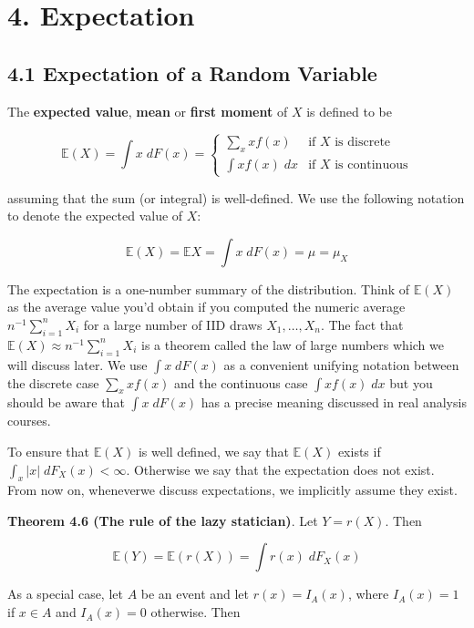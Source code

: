 \section{4. Expectation}\label{expectation}

\subsection{4.1 Expectation of a Random
Variable}\label{expectation-of-a-random-variable}

The \textbf{expected value}, \textbf{mean} or \textbf{first moment} of
\(X\) is defined to be

\[ \mathbb{E}(X) = \int x \; dF(x) = \begin{cases}
\sum_x x f(x) &\text{if } X \text{ is discrete} \\
\int x f(x)\; dx &\text{if } X \text{ is continuous}
\end{cases} \]

assuming that the sum (or integral) is well-defined. We use the
following notation to denote the expected value of \(X\):

\[ \mathbb{E}(X) = \mathbb{E}X = \int x\; dF(x) = \mu = \mu_X \]

The expectation is a one-number summary of the distribution. Think of
\(\mathbb{E}(X)\) as the average value you'd obtain if you computed the
numeric average \(n^{-1} \sum_{i=1}^n X_i\) for a large number of IID
draws \(X_1, \dots, X_n\). The fact that
\(\mathbb{E}(X) \approx n^{-1} \sum_{i=1}^n X_i\) is a theorem called
the law of large numbers which we will discuss later. We use
\(\int x \; dF(x)\) as a convenient unifying notation between the
discrete case \(\sum_x x f(x)\) and the continuous case
\(\int x f(x) \; dx\) but you should be aware that \(\int x \; dF(x)\)
has a precise meaning discussed in real analysis courses.

To ensure that \(\mathbb{E}(X)\) is well defined, we say that
\(\mathbb{E}(X)\) exists if \(\int_x |x| \; dF_X(x) < \infty\).
Otherwise we say that the expectation does not exist. From now on,
wheneverwe discuss expectations, we implicitly assume they exist.

\textbf{Theorem 4.6 (The rule of the lazy statician)}. Let \(Y = r(X)\).
Then

\[ \mathbb{E}(Y) = \mathbb{E}(r(X)) = \int r(x) \; dF_X(x) \]

As a special case, let \(A\) be an event and let \(r(x) = I_A(x)\),
where \(I_A(x) = 1\) if \(x \in A\) and \(I_A(x) = 0\) otherwise. Then


